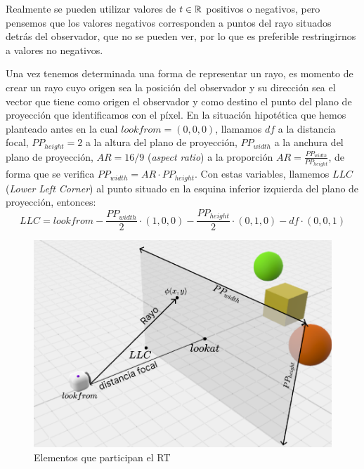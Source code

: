 \begin{observacion}
    Realmente se pueden utilizar valores de $t\in\mathbb{R}$ positivos o negativos, pero pensemos que los valores negativos corresponden a puntos del rayo situados detrás del observador, que no se pueden ver, por lo que es preferible restringirnos a valores no negativos.
\end{observacion}

Una vez tenemos determinada una forma de representar un rayo, es momento de crear un rayo cuyo origen sea la posición del observador y su dirección sea el vector que tiene como origen el observador y como destino el punto del plano de proyección que identificamos con el píxel. En la situación hipotética que hemos planteado antes en la cual $lookfrom=(0,0,0)$, llamamos $df$ a la distancia focal, $PP_{height}=2$ a la altura del plano de proyección, $PP_{width}$ a la anchura del plano de proyección, $AR = 16/9$ (\textit{aspect ratio}) a la proporción $AR = \frac{PP_{width}}{PP_{height}}$, de forma que se verifica $PP_{width}=AR\cdot PP_{height}$. Con estas variables, llamemos $LLC$ (\textit{Lower Left Corner}) al punto situado en la esquina inferior izquierda del plano de proyección, entonces:
\begin{equation}
    \label{eq:LLC-inicial}
    LLC = lookfrom - \frac{PP_{width}}{2}\cdot(1,0,0) - \frac{PP_{height}}{2}\cdot(0,1,0) - df \cdot (0,0,1)
\end{equation}

\begin{figure} [ht]
    \centering
    \includegraphics[scale = 0.3    ]{img/C7/elementos-PP.png}
    \caption{Elementos que participan el RT}
    \label{fig:elementos}
\end{figure}

